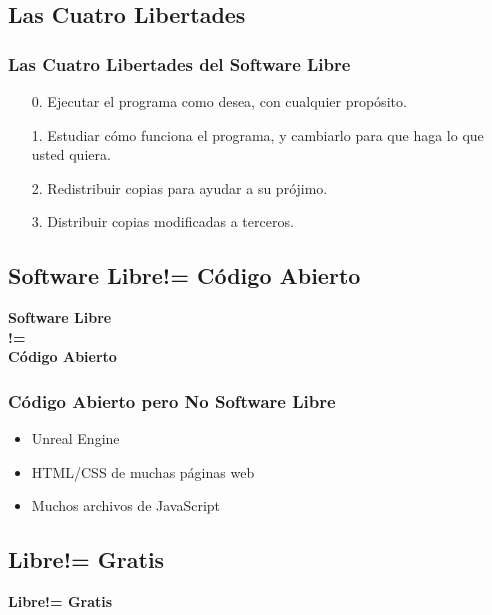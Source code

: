\documentclass[xetex, mathserif, serif]{beamer}
\begin{document}
\subsection{Las Cuatro Libertades}
\begin{frame}
    \frametitle{Las Cuatro Libertades del Software Libre}
    \pause{}
    \begin{enumerate}[<+->]
        \item[0.] Ejecutar el programa como desea, con cualquier propósito.
        \item[1.] Estudiar cómo funciona el programa, y cambiarlo para que haga lo que usted quiera.
        \item[2.] Redistribuir copias para ayudar a su prójimo.
        \item[3.] Distribuir copias modificadas a terceros.
    \end{enumerate}
\end{frame}


\subsection{Software Libre\texttt{}!= Código Abierto}
\begin{frame}
    \centering \Huge \textbf{Software Libre\\!=\\Código Abierto}
\end{frame}


\begin{frame}[t]
    \frametitle{Código Abierto pero No Software Libre}
    \pause{}
    \begin{itemize}[<+->]
        \item Unreal Engine
        \item HTML/CSS de muchas páginas web
        \item Muchos archivos de JavaScript
    \end{itemize}
\end{frame}


\subsection{Libre\texttt{}!= Gratis}
\begin{frame}
    \centering \Huge \textbf{Libre\texttt{}!= Gratis}
\end{frame}
\end{document}
